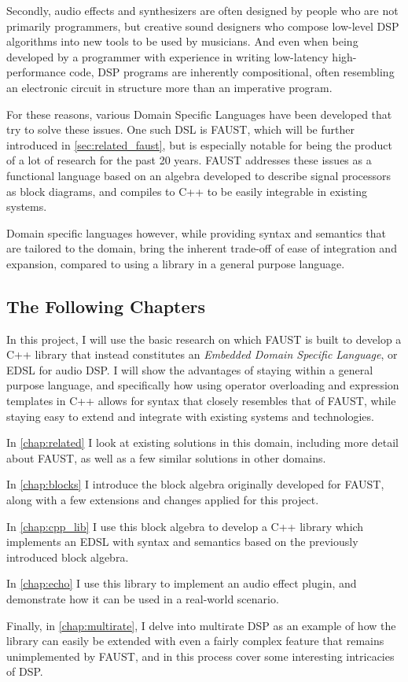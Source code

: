 Secondly, audio effects and synthesizers are often designed by people who are not primarily programmers, but
creative sound designers who compose low-level DSP algorithms into new tools to be used by musicians. And
even when being developed by a programmer with experience in writing low-latency high-performance code, DSP
programs are inherently compositional, often resembling an electronic circuit in structure more than an
imperative program.

For these reasons, various Domain Specific Languages have been developed that try to solve these issues. One
such DSL is FAUST\autocite{faustwebsite}, which will be further introduced in \autoref{sec:related_faust}, but is
especially notable for being the product of a lot of research for the past 20 years. FAUST addresses these
issues as a functional language based on an algebra developed to describe signal processors as block
diagrams, and compiles to C++ to be easily integrable in existing systems.

Domain specific languages however, while providing syntax and semantics that are tailored to the domain,
bring the inherent trade-off of ease of integration and expansion, compared to using a library in a general
purpose language.

\subsection{The Following Chapters}

In this project, I will use the basic research on which FAUST is built to develop a C++ library that instead
constitutes an \emph{Embedded Domain Specific Language}, or EDSL for audio DSP. I will show the advantages of staying within a
general purpose language, and specifically how using operator overloading and expression templates in C++
allows for syntax that closely resembles that of FAUST, while staying easy to extend and integrate with
existing systems and technologies.

In \autoref{chap:related} I look at existing solutions in this domain, including more detail about FAUST, as
well as a few similar solutions in other domains.

In \autoref{chap:blocks} I introduce the block algebra originally developed for FAUST, along with a few
extensions and changes applied for this project.

In \autoref{chap:cpp_lib} I use this block algebra to develop a C++ library which implements an EDSL with
syntax and semantics based on the previously introduced block algebra.

In \autoref{chap:echo} I use this library to implement an audio effect plugin, and demonstrate how it can
be used in a real-world scenario.

Finally, in \autoref{chap:multirate}, I delve into multirate DSP as an example of how the library can easily be
extended with even a fairly complex feature that remains unimplemented by FAUST, and in this process cover
some interesting intricacies of DSP.
